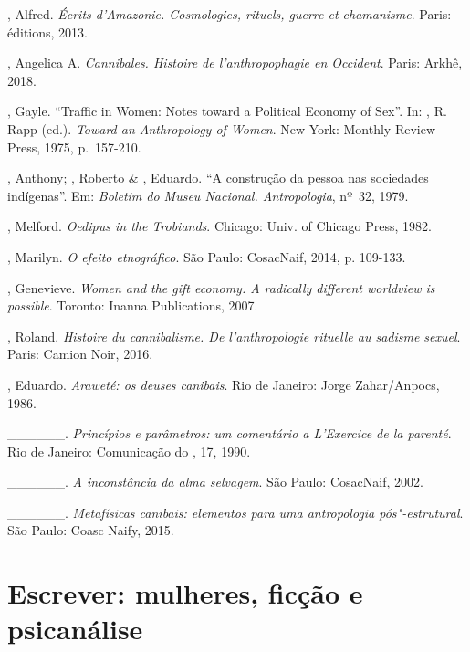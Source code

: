 \begin{Parskip}
, Alfred. \emph{Écrits d'Amazonie. Cosmologies, rituels, guerre
et chamanisme}. Paris:  éditions, 2013.

, Angelica A. \emph{Cannibales. Histoire de l'anthropophagie en
Occident}. Paris: Arkhê, 2018.

, Gayle. ``Traffic in Women: Notes toward a Political Economy of
Sex''. In: , R. Rapp (ed.). \emph{Toward an Anthropology of Women}.
New York: Monthly Review Press, 1975, p.~157-210.

, Anthony; , Roberto \& , Eduardo. ``A construção da pessoa nas sociedades indígenas''. Em: \emph{Boletim do Museu Nacional.
Antropologia}, nº~32, 1979.

, Melford. \emph{Oedipus in the Trobiands}. Chicago: Univ. of
Chicago Press, 1982.

, Marilyn. \emph{O efeito etnográfico}. São Paulo: CosacNaif, 2014, p. 109-133.

, Genevieve. \emph{Women and the gift economy. A radically
different worldview is possible}. Toronto: Inanna Publications, 2007.

, Roland. \emph{Histoire du cannibalisme. De l'anthropologie
rituelle au sadisme sexuel}. Paris: Camion Noir, 2016.

, Eduardo. \emph{Araweté: os deuses canibais}. Rio de
Janeiro: Jorge Zahar/Anpocs, 1986.

\_\_\_\_\_\_. \emph{Princípios e parâmetros: um comentário a L'Exercice de la parenté}. Rio de Janeiro: Comunicação do , 17, 1990.

\_\_\_\_\_\_. \emph{A inconstância da alma selvagem}. São Paulo: CosacNaif, 2002.

\_\_\_\_\_\_. \emph{Metafísicas canibais: elementos para uma antropologia pós"-estrutural}. São Paulo: Coasc Naify, 2015.
\end{Parskip}

\chapter*{Escrever: mulheres, ficção e psicanálise}

